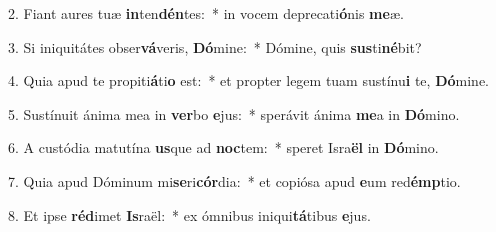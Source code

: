 2. Fiant aures tuæ \textbf{in}ten\textbf{dén}tes:~*  in vocem deprecati\textbf{ó}nis \textbf{me}æ.\

3. Si iniquitátes obser\textbf{vá}veris, \textbf{Dó}mine:~*  Dómine, quis \textbf{sus}ti\textbf{né}bit?\

4. Quia apud te propiti\textbf{á}ti\textbf{o} est:~*  et propter legem tuam sustínu\textbf{i} te, \textbf{Dó}mine.\

5. Sustínuit ánima mea in \textbf{ver}bo \textbf{e}jus:~*  sperávit ánima \textbf{me}a in \textbf{Dó}mino.\

6. A custódia matutína \textbf{us}que ad \textbf{noc}tem:~*  speret Isra\textbf{ël} in \textbf{Dó}mino.\

7. Quia apud Dóminum mi\textbf{se}ri\textbf{cór}dia:~*  et copiósa apud \textbf{e}um red\textbf{émp}tio.\

8. Et ipse \textbf{réd}imet \textbf{Is}raël:~*  ex ómnibus iniqui\textbf{tá}tibus \textbf{e}jus.\

